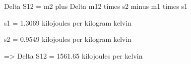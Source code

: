 Delta S12 = m2 plus Delta m12 times s2 minus m1 times s1  

s1 = 1.3069 kilojoules per kilogram kelvin  

s2 = 0.9549 kilojoules per kilogram kelvin  

=> Delta S12 = 1561.65 kilojoules per kelvin